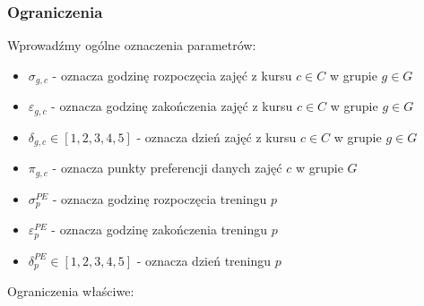 \documentclass{article}
\begin{document}
\subsubsection{Ograniczenia}
Wprowadźmy ogólne oznaczenia parametrów:
\begin{itemize}
    \item $\sigma_{g,c}$ - oznacza godzinę rozpoczęcia zajęć z kursu $c\in C$ w grupie $g\in G$
    \item $\varepsilon_{g,c}$ - oznacza godzinę zakończenia zajęć z kursu $c\in C$ w grupie $g\in G$
    \item $\delta_{g,c}\in [1,2,3,4,5]$ - oznacza dzień zajęć z kursu $c\in C$ w grupie $g\in G$

    \item $\pi_{g,c}$ - oznacza punkty preferencji danych zajęć $c$ w grupie $G$
    

    \item $\sigma^{PE}_{p}$ - oznacza godzinę rozpoczęcia treningu $p$
    \item $\varepsilon^{PE}_{p}$ - oznacza godzinę zakończenia treningu $p$
    \item $\delta^{PE}_{p}\in [1,2,3,4,5]$ - oznacza dzień treningu $p$

    
\end{itemize}
Ograniczenia właściwe:
\end{document}
